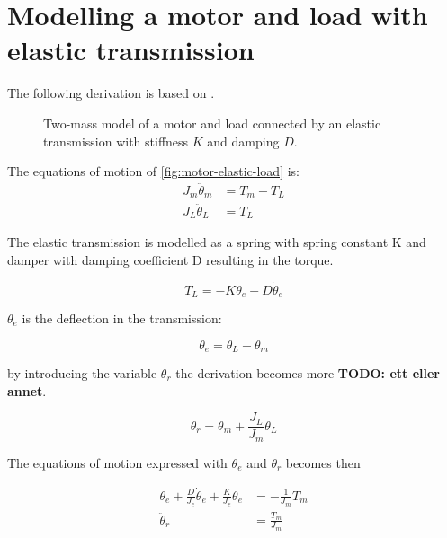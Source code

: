 \section{Modelling a motor and load with elastic transmission}
The following derivation is based on \citep{egeland2002modeling}.

\begin{figure}[htbp]
	\centering
	
	\caption{Two-mass model of a motor and load connected by an elastic transmission with stiffness $K$ and damping $D$.}
	\label{fig:motor-elastic-load}
\end{figure}

The equations of motion of \autoref{fig:motor-elastic-load} is:
\begin{align}
	J_m \ddot{\theta}_m & = T_m - T_L \label{eq:motor-eom} \\
	J_L \ddot{\theta}_L & = T_L \label{eq:load-eom}
\end{align}

The elastic transmission is modelled as a spring with spring constant K and damper with damping coefficient D resulting in the torque.

\begin{equation}
	T_L = -K\theta_e - D\dot{\theta}_e
	\label{eq:elastic-torque}
\end{equation}

$\theta_e$ is the deflection in the transmission:

\begin{equation}
	\theta_e = \theta_L - \theta_m
	\label{eq:elastic-deflection}
\end{equation}

by introducing the variable $\theta_r$ the derivation becomes more \textbf{TODO: ett eller annet}.

\begin{equation}
	\theta_r = \theta_m + \frac{J_L}{J_m}\theta_L
	\label{eq:theta-r}
\end{equation}

The equations of motion expressed with $\theta_e$ and $\theta_r$ becomes then

\begin{align}
	\ddot{\theta}_e + \frac{D}{J_e}\dot{\theta}_e + \frac{K}{J_e}\theta_e & = -\frac{1}{J_m}T_m \label{eq:eom-theta-e} \\
	\ddot{\theta}_r                                                       & = \frac{T_m}{J_m} \label{eq:eom-theta-r}
\end{align}

